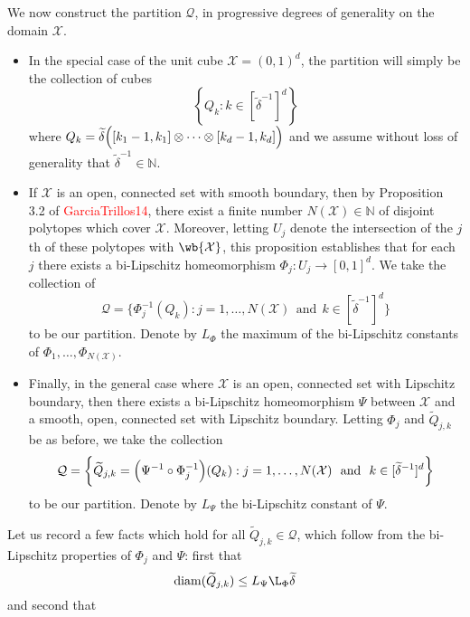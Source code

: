 \documentclass[twoside]{article}
\newcommand{\set}[1]{\left\{#1\right\}}
\newcommand{\diam}{\mathrm{diam}}
\newcommand{\1}{\mathbf{1}}
\newcommand{\Xset}{\mathcal{X}}
\newcommand{\mc}[1]{\mathcal{#1}}
\newcommand{\wt}[1]{\widetilde{#1}}
\theoremstyle{definition}
\theoremstyle{remark}
\begin{document}
We now construct the partition $\mc{Q}$, in progressive degrees of generality on the domain $\Xset.$
\begin{itemize}
	\item In the special case of the unit cube $\Xset = (0,1)^d$, the partition will simply be the collection of cubes
	\begin{equation*}
	\set{Q_k: k \in [\wt{\delta}^{-1}]^d} 
	\end{equation*}
	where $Q_k = \wt{\delta}\Bigl([k_1 - 1,k_1] \otimes \cdots \otimes [k_d - 1,k_d]\Bigr)$ and we assume without loss of generality that $\wt{\delta}^{-1} \in \mathbb{N}$.
	\item If $\mc{\Xset}$ is an open, connected set with smooth boundary, then by Proposition 3.2 of \textcolor{red}{GarciaTrillos14}, there exist a finite number $N(\Xset) \in \mathbb{N}$ of disjoint polytopes which cover $\Xset$. Moreover, letting $U_j$ denote the intersection of the $j$th of these polytopes with $\wb{\Xset}$, this proposition establishes that for each $j$ there exists a bi-Lipschitz homeomorphism $\Phi_j: U_j \to [0,1]^d$. We take the collection of
	\begin{equation*}
	\mc{Q} = \biggl\{\Phi_j^{-1}(Q_k): j = 1,\ldots,N(\Xset)~~\textrm{and}~~k \in [\wt{\delta}^{-1}]^d\biggr\}
	\end{equation*}
	to be our partition. Denote by $L_{\Phi}$ the maximum of the bi-Lipschitz constants of $\Phi_1,\ldots,\Phi_{N(\Xset)}$.
	\item Finally, in the general case where $\Xset$ is an open, connected set with Lipschitz boundary, then there exists a bi-Lipschitz homeomorphism $\Psi$ between $\Xset$ and a smooth, open, connected set with Lipschitz boundary. Letting $\Phi_j$ and $\wt{Q}_{j,k}$ be as before, we take the collection
	\begin{equation*}
	\mc{Q} = \biggl\{\wt{Q}_{j,k} = \Bigl(\Psi^{-1} \circ \Phi_j^{-1}\Bigr)(Q_k): j = 1,\ldots,N(\Xset)~~\textrm{and}~~k \in [\wt{\delta}^{-1}]^d\biggr\}
	\end{equation*}
	to be our partition. Denote by $L_{\Psi}$ the bi-Lipschitz constant of $\Psi$.
\end{itemize}
Let us record a few facts which hold for all $\wt{Q}_{j,k} \in \mc{Q}$, which follow from the bi-Lipschitz properties of $\Phi_j$ and $\Psi$: first that
\begin{equation}
\label{pf:prop_optimal_transport_1}
\diam(\wt{Q}_{j,k}) \leq L_{\Psi} \L_{\Phi} \wt{\delta}
\end{equation}
and second that
\end{document}
